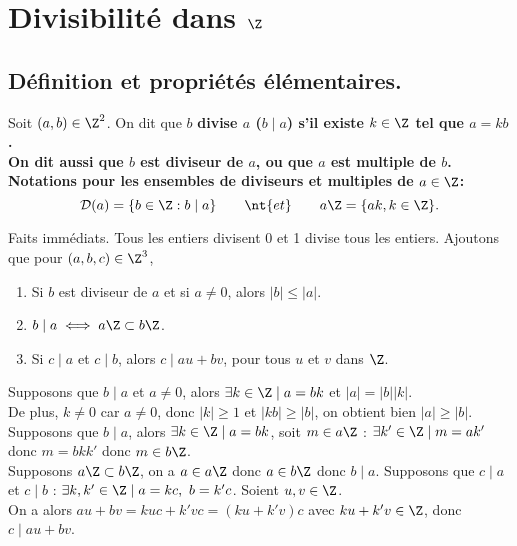 \documentclass[11pt]{article}
\renewcommand*{\D}{\mathcal{D}}
\begin{document}


\section{Divisibilité dans \texorpdfstring{$\Z$}{Lg}}

\subsection{Définition et propriétés élémentaires.}

\begin{defi}{}{}
    Soit $(a,b)\in\Z^2$. On dit que $b$ \bf{divise} $a$ ($b\mid a$) s'il existe $k\in\Z$ tel que $a=kb$.\\
    On dit aussi que $b$ est \bf{diviseur} de $a$, ou que $a$ est \bf{multiple} de $b$.\n
    Notations pour les ensembles de diviseurs et multiples de $a\in\Z$:
    \begin{equation*}
        \D(a)=\{b\in\Z:b\mid a\} \qquad \nt{et} \qquad a\Z=\{ak,k\in\Z\}.
    \end{equation*}
\end{defi}

\begin{prop}{Faits immédiats.}{}
    Tous les entiers divisent 0 et 1 divise tous les entiers. Ajoutons que pour $(a,b,c)\in\Z^3$,
    \begin{enumerate}[topsep=0pt,itemsep=-0.9 ex]
        \item Si $b$ est diviseur de $a$ et si $a\neq0$, alors $|b|\leq|a|$.
        \item $b\mid a \iff a\Z \subset b\Z$.
        \item Si $c\mid a$ et $c\mid b$, alors $c\mid au+bv$, pour tous $u$ et $v$ dans $\Z$.
    \end{enumerate}
    \tcblower
     Supposons que $b\mid a$ et $a\neq 0$, alors $\exists k \in \Z \mid a = bk$ et $|a|=|b||k|$.\\
    De plus, $k\neq0$ car $a\neq0$, donc $|k|\geq1$ et $|kb|\geq |b|$, on obtient bien $|a|\geq |b|$.\n
     Supposons que $b\mid a$, alors $\exists k \in \Z \mid a = bk$, soit $m\in a\Z$ : $\exists k'\in\Z\mid m=ak'$ donc $m=bkk'$ donc $m\in b\Z$.\\
    Supposons $a\Z\subset b\Z$, on a $a\in a\Z$ donc $a\in b\Z$ donc $b\mid a$.\n
     Supposons que $c\mid a$ et $c \mid b$ : $\exists k,k'\in\Z\mid a=kc,~b=k'c$. Soient $u,v\in\Z$.\\
    On a alors $au+bv=kuc+k'vc=(ku+k'v)c$ avec $ku+k'v\in\Z$, donc $c\mid au+bv$.
\end{prop}
\end{document}

